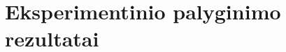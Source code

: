 \documentclass{VUMIFInfBakalaurinis}
\begin{document}
\printbibliography[heading=bibintoc]

\appendix  %


\section{Eksperimentinio palyginimo rezultatai}
\end{document}
